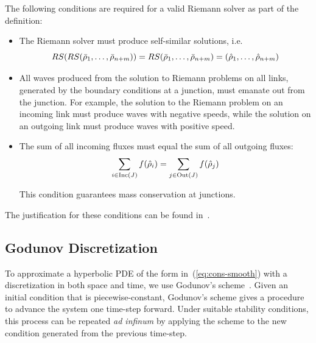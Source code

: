 The following conditions are required for a valid Riemann solver as
part of the definition: 
\begin{itemize}
\item The Riemann solver must produce self-similar solutions, i.e. 
\[
\RS\left(\RS\tuple{\initstate_{1}}{\initstate_{\ninc+\nout}}\right)=\RS\tuple{\initstate_{1}}{\initstate_{\ninc+\nout}}=\tuple{\trace{\cvar}_{1}}{\trace{\cvar}_{\ninc+\nout}}
\]

\item All waves produced from the solution to Riemann problems on all links,
generated by the boundary conditions at a junction, must emanate out
from the junction. For example, the solution to the Riemann problem
on an incoming link must produce waves with negative speeds, while
the solution on an outgoing link must produce waves with positive
speed. 
\item The sum of all incoming fluxes must equal the sum of all outgoing
fluxes: 
\[
\sum_{i\in\Inc\left(\jn\right)}f\left(\trace{\cvar}_{\link}\right)=\sum_{j\in\Out\left(\jn\right)}f\left(\trace{\cvar}_{j}\right)
\]



This condition guarantees mass conservation at junctions.

\end{itemize}
The justification for these conditions can be found in~\cite{garavello2006traffic}.


\subsection{Godunov Discretization\label{sub:Godunov-Discretization}}

To approximate a hyperbolic PDE of the form in~(\ref{eq:cons-smooth})
with a discretization in both space and time, we use Godunov's scheme~\cite{godunov1959}.
Given an initial condition that is piecewise-constant, Godunov's scheme
gives a procedure to advance the system one time-step forward. Under
suitable stability conditions, this process can be repeated \emph{ad
infinum }by applying the scheme to the new condition generated from
the previous time-step.

